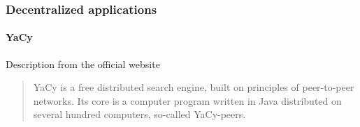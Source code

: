 
\subsubsection{Decentralized applications}

\paragraph{YaCy}
Description from the official website \cite{YaCyWebPeople}
\blockquote{YaCy is a free distributed search engine, built on principles of peer-to-peer networks. Its core is a computer program written in Java distributed on several hundred computers, so-called YaCy-peers.}

